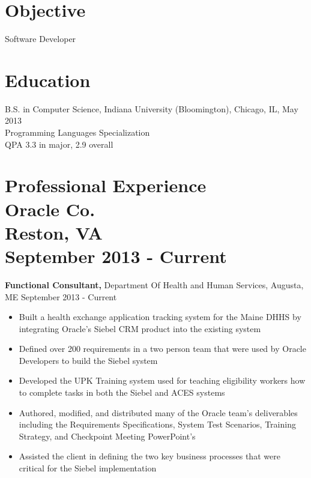 \documentclass[margin]{res}
\begin{document}
 
 
 
\address{{\bf Present Address} \\ 4830 N. Hoyne ave, Unit 1 \\ Chicago, IL 60625  \\
        (973) 900-0956 }

\begin{resume} 

\section{Objective} 
Software Developer 

\section{Education} 
B.S. in Computer Science, Indiana University (Bloomington), Chicago, IL, May 2013 \\
Programming Languages Specialization \\
QPA 3.3 in major, 2.9 overall
 
\section{Professional Experience \\ Oracle Co. \\ Reston, VA \\ September 2013 - Current}
 {\bf Functional Consultant,} Department Of Health and Human Services, Augusta, ME \hfill September 2013 - Current
 \begin{itemize} \itemsep -2pt
 \item Built a health exchange application tracking system for the 
 				Maine DHHS by integrating Oracle's Siebel
				CRM product into the existing system
 \item Defined over 200 requirements in a two person team that were
				used by Oracle Developers to build the
				Siebel system
 \item Developed the UPK Training system used for teaching eligibility
				workers how to complete tasks in both
				the Siebel and ACES systems
 \item Authored, modified, and distributed many of the Oracle team's
				deliverables including the Requirements
				Specifications, System Test Scenarios, Training Strategy,
				and Checkpoint Meeting PowerPoint's
 \item Assisted the client in defining the two key business processes
				that were critical for the Siebel implementation
 \end{itemize}


\end{resume}
\end{document}
